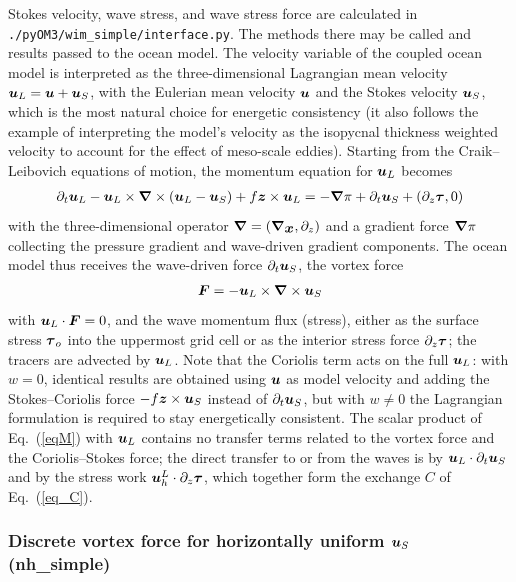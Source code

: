 \documentclass[12pt]{article}
\newcommand{\beq}  { \begin{eqnarray} }
\newcommand{\eeq}  { \end{eqnarray}}
\newcommand{\eq }  [1]{Eq.~(\ref{#1})}  %
\renewcommand{\v}[1]{{\mbox{\boldmath$ #1 $}}}  %
\newcommand{\p}{{\partial}}
\newcommand{\vn}{{\v \nabla}}
\begin{document}
 
 Stokes velocity, wave stress, and wave stress force are calculated in \verb|./pyOM3/wim_simple/interface.py|.
 The methods there may be called and results passed to the ocean model.
 The velocity variable of the coupled ocean model is interpreted as the
 three-dimensional Lagrangian mean velocity $\v u_L = \v u + \v u_S$, with the
 Eulerian mean velocity $\v u$ and the Stokes velocity $\v u_S$, which is the most
 natural choice for energetic consistency (it also follows the example of interpreting
 the model's velocity as the isopycnal thickness weighted velocity to account for the
 effect of meso-scale eddies). Starting from the Craik--Leibovich equations of motion,
 the momentum equation for $\v u_L$ becomes
\beq \label{eqM}
\p_t \v u_L  -  \v u_L \times \vn \times (\v u_L-\v u_S)
 + f \v z \times \v u_L  = - \vn \pi + \p_t \v u_S + (\p_z \v  \tau,0)
\eeq
with the three-dimensional operator $\vn = (\vn_{\v x}, \p_z)$ and a gradient force
$\vn \pi$ collecting the pressure gradient and wave-driven gradient components.
The ocean model thus receives the wave-driven force $\p_t \v u_S$, the vortex force
\beq \label{eq:vf_cont0}
\v F = - \v u_L \times \vn \times \v u_S
\eeq
with $\v u_L \cdot \v F = 0$, and the wave momentum flux (stress), either as the
surface stress $\v \tau_o$ into the uppermost grid cell or as the interior stress
force $\p_z \v \tau$; the tracers are advected by $\v u_L$.
Note that the Coriolis term acts on the full $\v u_L$: with $w = 0$, identical
results are obtained using $\v u$ as model velocity and adding the Stokes--Coriolis
force $-f \v z \times \v u_S$ instead of $\p_t \v u_S$, but with $w \neq 0$ the
Lagrangian formulation is required to stay energetically consistent. The scalar
product of \eq{eqM} with $\v u_L$ contains no transfer terms related to the vortex
force and the Coriolis--Stokes force; the direct transfer to or from the waves is by
$\v u_L \cdot \p_t \v u_S$ and by the stress work $\v u_h^L \cdot \p_z \v \tau$,
which together form the exchange $C$ of \eq{eq_C}.

\subsubsection*{Discrete vortex force for horizontally uniform $\v u_S$ (nh\_simple)}
\end{document}
